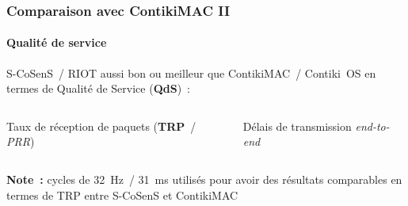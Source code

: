 \documentclass[10pt,c]{beamer}
\newcommand{\lang}[1]{\textit{#1}}
\newcommand{\nom}[1]{\textbf{#1}}
\begin{document}
\begin{frame}[label=comparContikiMAC2]
\frametitle{Comparaison avec ContikiMAC II}
\framesubtitle{Qualité de service}

S-CoSenS~/ RIOT aussi bon ou meilleur que ContikiMAC~/ Contiki~OS
en termes de Qualité de Service (\nom{QdS})~:

\vspace{-0.25cm}

\begin{columns}[c]

\begin{column}{5.5cm}


{\footnotesize Taux de réception de paquets
                \scriptsize(\nom{TRP}~/ \lang{PRR})}

\end{column}

\begin{column}{5.5cm}


{\footnotesize Délais de transmission \lang{end-to-end}}
\end{column}

\end{columns}

\vspace{0.5cm}

\scriptsize{\textbf{Note~:} cycles de 32~Hz~/ 31~ms utilisés pour avoir
 des résultats comparables en termes de TRP entre S-CoSenS et ContikiMAC}

\end{frame}
\end{document}
